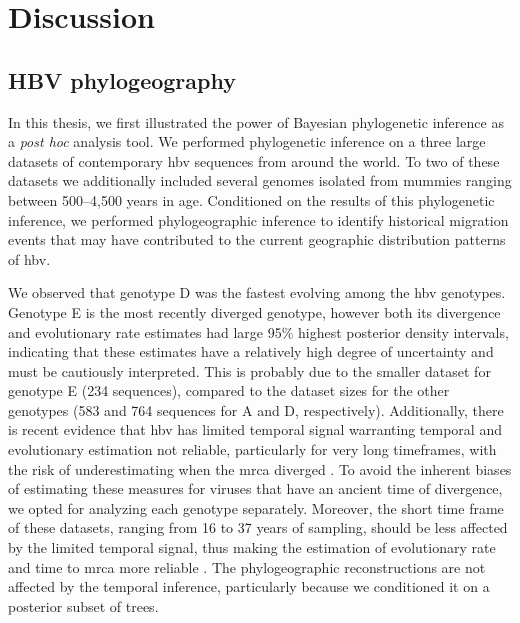 \chapter{Discussion}
\label{ch:discussion}

\section{HBV phylogeography}

In this thesis, we first illustrated the power of Bayesian phylogenetic inference as a \textit{post hoc} analysis tool.
We performed phylogenetic inference on a three large datasets of contemporary \gls{hbv} sequences from around the world.
To two of these datasets we additionally included several genomes isolated from mummies ranging between 500--4,500 years in age.
Conditioned on the results of this phylogenetic inference, we performed phylogeographic inference to identify historical migration events that may have contributed to the current geographic distribution patterns of \gls{hbv}.

We observed that genotype D was the fastest evolving among the \gls{hbv} genotypes.
Genotype E is the most recently diverged genotype, however both its divergence and evolutionary rate estimates had large 95\% highest posterior density intervals, indicating that these estimates have a relatively high degree of uncertainty and must be cautiously interpreted.
This is probably due to the smaller dataset for genotype E (234 sequences), compared to the dataset sizes for the other genotypes (583 and 764 sequences for A and D, respectively).
Additionally, there is recent evidence that \gls{hbv} has limited temporal signal warranting temporal and evolutionary estimation not reliable, particularly for very long timeframes, with the risk of underestimating when the \gls{mrca} diverged \cite{ross2018paradox}.
To avoid the inherent biases of estimating these measures for viruses that have an ancient time of divergence, we opted for analyzing each genotype separately.
Moreover, the short time frame of these datasets, ranging from 16 to 37 years of sampling, should be less affected by the limited temporal signal, thus making the estimation of evolutionary rate and time to \gls{mrca} more reliable \cite{worobey2020emergence}. %
The phylogeographic reconstructions are not affected by the temporal inference, particularly because we conditioned it on a posterior subset of trees.

